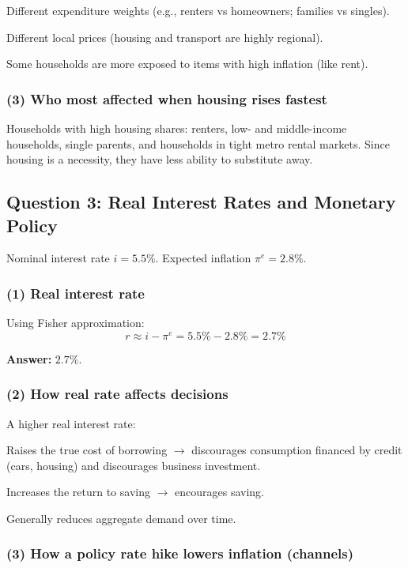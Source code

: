 \documentclass[11pt]{article}
\begin{document}
Different expenditure weights (e.g., renters vs homeowners; families vs singles).

Different local prices (housing and transport are highly regional).

Some households are more exposed to items with high inflation (like rent).

\subsubsection*{(3) Who most affected when housing rises fastest}

Households with high housing shares: renters, low- and middle-income households, single parents, and households in tight metro rental markets. Since housing is a necessity, they have less ability to substitute away.
\newpage
\subsection*{Question 3: Real Interest Rates and Monetary Policy}

Nominal interest rate \(i=5.5\%\). Expected inflation \(\pi^e=2.8\%\).

\subsubsection*{(1) Real interest rate}

Using Fisher approximation:
\[
r\approx i-\pi^e=5.5\%-2.8\%=2.7\%
\]

\textbf{Answer:} \(2.7\%\).

\subsubsection*{(2) How real rate affects decisions}

A higher real interest rate:

Raises the true cost of borrowing \(\rightarrow\) discourages consumption financed by credit (cars, housing) and discourages business investment.

Increases the return to saving \(\rightarrow\) encourages saving.

Generally reduces aggregate demand over time.

\subsubsection*{(3) How a policy rate hike lowers inflation (channels)}
\end{document}
